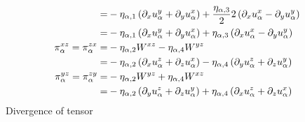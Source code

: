 \begin{align*}
    \\
    =& -\eta_{\alpha,1}
    \left(\partial_x u^{y}_{\alpha} + \partial_y u^{x}_{\alpha}\right)
    +\frac{\eta_{\alpha,3}}{2}
    2\left(\partial_x u^{x}_{\alpha} - \partial_y u^{y}_{\alpha} \right)
    \\
    =& -\eta_{\alpha,1}
    \left(\partial_x u^{y}_{\alpha} + \partial_y u^{x}_{\alpha}\right)
    +      \eta_{\alpha,3}
     \left(\partial_x u^{x}_{\alpha} - \partial_y u^{y}_{\alpha} \right)
    \\
    \pi^{xz}_{\alpha} = \pi^{zx}_{\alpha}
=& -\eta_{\alpha,2}W^{xz} - \eta_{\alpha,4}W^{yz}
    \\
    =& -\eta_{\alpha,2}
    \left(\partial_x u^{z}_{\alpha} + \partial_z u^{x}_{\alpha}\right)
    - \eta_{\alpha,4}
    \left(\partial_y u^{z}_{\alpha} + \partial_z u^{y}_{\alpha}\right)
    \\
    \pi^{yz}_{\alpha} = \pi^{zy}_{\alpha}
    =& -\eta_{\alpha,2}W^{yz} + \eta_{\alpha,4}W^{xz}
    \\
    =& -\eta_{\alpha,2}
    \left(\partial_y u^{z}_{\alpha} + \partial_z u^{y}_{\alpha}\right)
    + \eta_{\alpha,4}
    \left(\partial_x u^{z}_{\alpha} + \partial_z u^{x}_{\alpha}\right)
\end{align*}
%
Divergence of tensor
%
